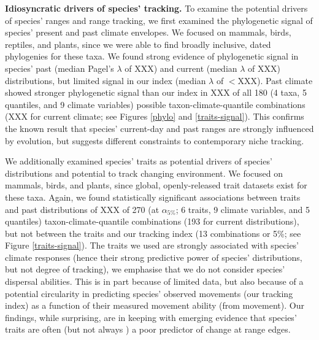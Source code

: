 \documentclass[12pt]{report}
\begin{document}
\textbf{Idiosyncratic drivers of species' tracking.} To examine the
potential drivers of species' ranges and range tracking, we first
examined the phylogenetic signal of species' present and past climate
envelopes. We focused on mammals, birds, reptiles, and plants, since
we were able to find broadly inclusive, dated phylogenies for these
taxa. We found strong evidence of phylogenetic signal in species' past
(median Pagel's $\lambda$\supercite{Pagel1999} of XXX) and current
(median $\lambda$ of XXX) distributions, but limited signal in our
index (median $\lambda$ of $<$XXX). Past climate showed stronger
phylogenetic signal than our index in XXX of all 180 (4 taxa, 5
quantiles, and 9 climate variables) possible taxon-climate-quantile
combinations (XXX for current climate; see Figures \ref{phylo} and
\ref{traits-signal}). This confirms the known result that species'
current-day and past ranges are strongly influenced by
evolution\supercite{Peterson1999,Wiens2010}, but suggests different
constraints to contemporary niche tracking.

We additionally examined species' traits as potential drivers of
species' distributions and potential to track changing environment. We
focused on mammals, birds, and plants, since global, openly-released
trait datasets exist for these taxa. Again, we found statistically
significant associations between traits and past distributions of XXX
of 270 (at $\alpha_{5\%}$; 6 traits, 9 climate variables, and 5
quantiles) taxon-climate-quantile combinations (193 for current
distributions), but not between the traits and our tracking index (13
combinations or 5\%; see Figure \ref{traits-signal}). The traits we
used are strongly associated with species' climate
responses\supercite{Wright2004,McCain2014,Estrada2016} (hence their
strong predictive power of species' distributions, but not degree of
tracking), we emphasise that we do not consider species' dispersal
abilities\supercite{Schloss2012}. This is in part because of limited
data, but also because of a potential circularity in predicting
species' observed movements (our tracking index) as a function of
their measured movement ability (from movement). Our findings, while
surprising, are in keeping with emerging evidence that species' traits
are often \supercite{Angert2011,MacLean2017} (but not always
\supercite{Sunday2015,Pacifici2020}) a poor predictor of change at
range edges.
\end{document}
